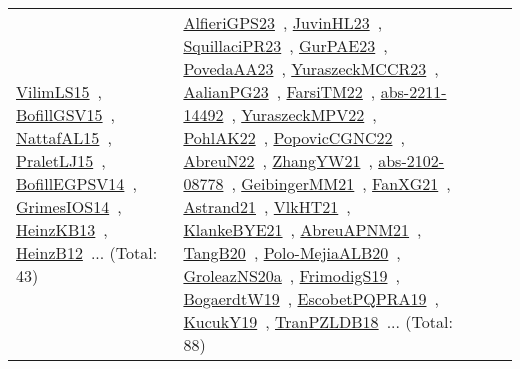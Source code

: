 {\begin{longtable}{lp{3cm}>{\raggedright\arraybackslash}p{6cm}>{\raggedright\arraybackslash}p{6cm}>{\raggedright\arraybackslash}p{8cm}}
\href{works/VilimLS15.pdf}{VilimLS15}~\cite{VilimLS15}, \href{works/BofillGSV15.pdf}{BofillGSV15}~\cite{BofillGSV15}, \href{works/NattafAL15.pdf}{NattafAL15}~\cite{NattafAL15}, \href{works/PraletLJ15.pdf}{PraletLJ15}~\cite{PraletLJ15}, \href{works/BofillEGPSV14.pdf}{BofillEGPSV14}~\cite{BofillEGPSV14}, \href{works/GrimesIOS14.pdf}{GrimesIOS14}~\cite{GrimesIOS14}, \href{works/HeinzKB13.pdf}{HeinzKB13}~\cite{HeinzKB13}, \href{works/HeinzB12.pdf}{HeinzB12}~\cite{HeinzB12}... (Total: 43) & \href{works/AlfieriGPS23.pdf}{AlfieriGPS23}~\cite{AlfieriGPS23}, \href{works/JuvinHL23.pdf}{JuvinHL23}~\cite{JuvinHL23}, \href{works/SquillaciPR23.pdf}{SquillaciPR23}~\cite{SquillaciPR23}, \href{works/GurPAE23.pdf}{GurPAE23}~\cite{GurPAE23}, \href{works/PovedaAA23.pdf}{PovedaAA23}~\cite{PovedaAA23}, \href{works/YuraszeckMCCR23.pdf}{YuraszeckMCCR23}~\cite{YuraszeckMCCR23}, \href{works/AalianPG23.pdf}{AalianPG23}~\cite{AalianPG23}, \href{works/FarsiTM22.pdf}{FarsiTM22}~\cite{FarsiTM22}, \href{works/abs-2211-14492.pdf}{abs-2211-14492}~\cite{abs-2211-14492}, \href{works/YuraszeckMPV22.pdf}{YuraszeckMPV22}~\cite{YuraszeckMPV22}, \href{works/PohlAK22.pdf}{PohlAK22}~\cite{PohlAK22}, \href{works/PopovicCGNC22.pdf}{PopovicCGNC22}~\cite{PopovicCGNC22}, \href{works/AbreuN22.pdf}{AbreuN22}~\cite{AbreuN22}, \href{works/ZhangYW21.pdf}{ZhangYW21}~\cite{ZhangYW21}, \href{works/abs-2102-08778.pdf}{abs-2102-08778}~\cite{abs-2102-08778}, \href{works/GeibingerMM21.pdf}{GeibingerMM21}~\cite{GeibingerMM21}, \href{works/FanXG21.pdf}{FanXG21}~\cite{FanXG21}, \href{works/Astrand21.pdf}{Astrand21}~\cite{Astrand21}, \href{works/VlkHT21.pdf}{VlkHT21}~\cite{VlkHT21}, \href{works/KlankeBYE21.pdf}{KlankeBYE21}~\cite{KlankeBYE21}, \href{works/AbreuAPNM21.pdf}{AbreuAPNM21}~\cite{AbreuAPNM21}, \href{works/TangB20.pdf}{TangB20}~\cite{TangB20}, \href{works/Polo-MejiaALB20.pdf}{Polo-MejiaALB20}~\cite{Polo-MejiaALB20}, \href{works/GroleazNS20a.pdf}{GroleazNS20a}~\cite{GroleazNS20a}, \href{works/FrimodigS19.pdf}{FrimodigS19}~\cite{FrimodigS19}, \href{works/BogaerdtW19.pdf}{BogaerdtW19}~\cite{BogaerdtW19}, \href{works/EscobetPQPRA19.pdf}{EscobetPQPRA19}~\cite{EscobetPQPRA19}, \href{works/KucukY19.pdf}{KucukY19}~\cite{KucukY19}, \href{works/TranPZLDB18.pdf}{TranPZLDB18}~\cite{TranPZLDB18}... (Total: 88)\\

\end{longtable}}

